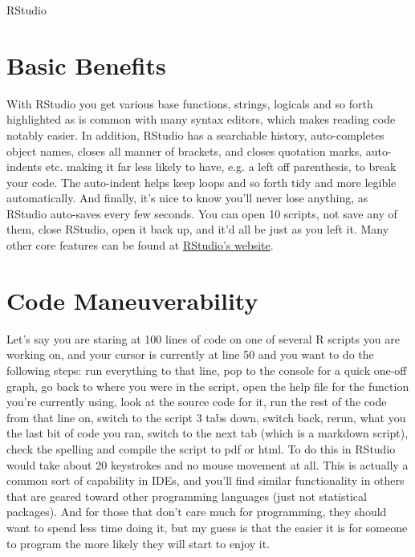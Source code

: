 \documentclass[english,nohyper,titlepage]{tufte-handout}\usepackage[]{graphicx}\usepackage[]{color}
\begin{document}
RStudio

\section{Basic Benefits}
With RStudio you get various base functions, strings, logicals and so forth highlighted as is common with many syntax editors, which makes reading code notably easier. In addition, RStudio has a searchable history, auto-completes object names, closes all manner of brackets, and closes quotation marks, auto-indents etc. making it far less likely to have, e.g. a left off parenthesis, to break your code.  The auto-indent helps keep loops and so forth tidy and more legible automatically. And finally, it's nice to know you'll never lose anything, as RStudio auto-saves every few seconds.  You can open 10 scripts, not save any of them, close RStudio, open it back up, and it'd all be just as you left it.  Many other core features can be found at \href{http://www.rstudio.com/products/rstudio/features/}{RStudio's website}.


\section{Code Maneuverability} Let's say you are staring at 100 lines of code on one of several R scripts you are working on, and your cursor is currently at line 50 and you want to do the following steps: run everything to that line, pop to the console for a quick one-off graph, go back to where you were in the script, open the help file for the function you're currently using, look at the source code for it, run the rest of the code from that line on, switch to the script 3 tabs down, switch back, rerun, what you the last bit of code you ran, switch to the next tab (which is a markdown script), check the spelling and compile the script to pdf or html.  To do this in RStudio would take about 20 keystrokes and no mouse movement at all.  This is actually a common sort of capability in IDEs, and you'll find similar functionality in others that are geared toward other programming languages (just not statistical packages).  And for those that don't care much for programming, they should want to spend less time doing it, but my guess is that the easier it is for someone to program the more likely they will start to enjoy it.
\end{document}
